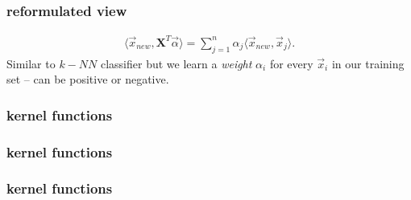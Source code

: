\documentclass[handout,compress]{beamer}
\newcommand{\bv}[1]{\mathbf{#1}}
\begin{document}
\begin{frame} 
	\frametitle{reformulated view}
	\begin{align*}
	\langle\vec{x}_{new}, \bv{X}^T\vec{\alpha}\rangle = \sum_{j=1}^n \alpha_j \langle\vec{x}_{new}, \vec{x}_j\rangle.
	\end{align*}
	Similar to $k-NN$ classifier but we learn a \emph{weight} $\alpha_i$ for every $\vec{x}_i$ in our training set -- can be positive or negative. 
	
\end{frame}

\begin{frame} 
	\frametitle{kernel functions}
	
\end{frame}

\begin{frame} 
	\frametitle{kernel functions}
	
\end{frame}

\begin{frame} 
	\frametitle{kernel functions}
	
\end{frame}
\end{document}
